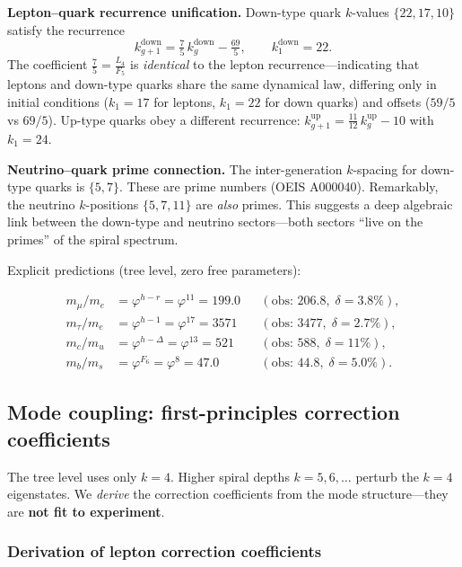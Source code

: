 \documentclass[12pt,a4paper]{article}
\begin{document}
\textbf{Lepton--quark recurrence unification.} Down-type quark $k$-values $\{22, 17, 10\}$ satisfy the recurrence
\begin{equation}
k_{g+1}^{\text{down}} = \tfrac{7}{5}\,k_g^{\text{down}} - \tfrac{69}{5}, \qquad k_1^{\text{down}} = 22.
\end{equation}
The coefficient $\frac{7}{5} = \frac{L_4}{F_5}$ is \emph{identical} to the lepton recurrence---indicating that leptons and down-type quarks share the same dynamical law, differing only in initial conditions ($k_1 = 17$ for leptons, $k_1 = 22$ for down quarks) and offsets ($59/5$ vs $69/5$). Up-type quarks obey a different recurrence: $k_{g+1}^{\text{up}} = \frac{11}{12}\,k_g^{\text{up}} - 10$ with $k_1 = 24$.

\textbf{Neutrino--quark prime connection.} The inter-generation $k$-spacing for down-type quarks is $\{5, 7\}$. These are prime numbers (OEIS A000040). Remarkably, the neutrino $k$-positions $\{5, 7, 11\}$ are \emph{also} primes. This suggests a deep algebraic link between the down-type and neutrino sectors---both sectors ``live on the primes'' of the spiral spectrum.

Explicit predictions (tree level, zero free parameters):

\begin{align}
m_\mu / m_e &= \varphi^{h-r} = \varphi^{11} = 199.0 && (\text{obs: } 206.8, \;\delta = 3.8\%), \label{eq:mu-mass}\\
m_\tau / m_e &= \varphi^{h-1} = \varphi^{17} = 3571 && (\text{obs: } 3477, \;\delta = 2.7\%), \label{eq:tau-mass}\\
m_c / m_u &= \varphi^{h-\Delta} = \varphi^{13} = 521 && (\text{obs: } 588, \;\delta = 11\%), \\
m_b / m_s &= \varphi^{F_6} = \varphi^{8} = 47.0 && (\text{obs: } 44.8, \;\delta = 5.0\%).
\end{align}

\subsection{Mode coupling: first-principles correction coefficients}
\label{sec:delta-correction}

The tree level uses only $k = 4$. Higher spiral depths $k = 5, 6, \ldots$ perturb the $k = 4$ eigenstates. We \emph{derive} the correction coefficients from the mode structure---they are \textbf{not fit to experiment}.

\subsubsection{Derivation of lepton correction coefficients}
\end{document}
